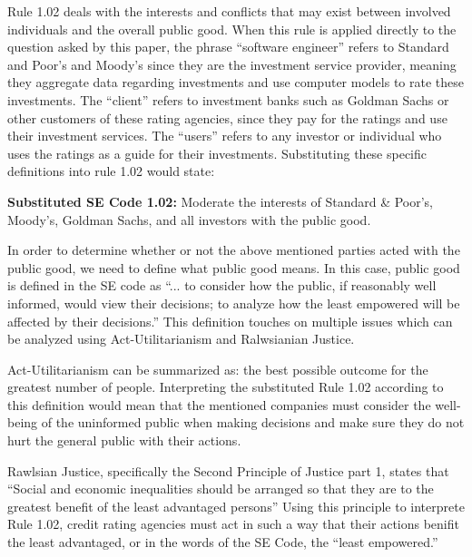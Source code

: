 \documentclass[11pt]{article}
\begin{document}
\begin{multicols}{2}
Rule 1.02 deals with the interests and conflicts that may exist between involved individuals and the overall public good.  When this rule is applied directly to the question asked by this paper, the phrase ``software engineer'' refers to Standard and Poor's and Moody's since they are the investment service provider, meaning they aggregate data regarding investments and use computer models to rate these investments. The ``client'' refers to investment banks such as Goldman Sachs or other customers of these rating agencies, since they pay for the ratings and use their investment services.  The ``users'' refers to any investor or individual who uses the ratings as a guide for their investments.  Substituting these specific definitions into rule 1.02 would state:

\begin{framed}
\noindent
   \textbf{Substituted SE Code 1.02: }  
   \newline
   Moderate the interests of Standard \& Poor's, Moody's, Goldman Sachs, and all investors with the public good.
\end{framed}


In order to determine whether or not the above mentioned parties acted with the public good, we need to define what public good means.  In this case, public good is defined in the SE code as ``... to consider how the public, if reasonably well informed, would view their decisions; to analyze how the least empowered will be affected by their decisions.'' \cite{SEcode}  This definition touches on multiple issues which can be analyzed using Act-Utilitarianism and Ralwsianian Justice. 

Act-Utilitarianism can be summarized as: the best possible outcome for the greatest number of people.\cite{utility}  Interpreting the substituted Rule 1.02 according to this definition would mean that the mentioned companies must consider the well-being of the uninformed public when making decisions and make sure they do not hurt the general public with their actions. 

Rawlsian Justice, specifically the Second Principle of Justice part 1, states that ``Social and economic inequalities should be arranged so that they are to the greatest benefit of the least advantaged persons'' \cite{rawlsian} Using this principle to interprete Rule 1.02, credit rating agencies must act in such a way that their actions benifit the least advantaged, or in the words of the SE Code, the ``least empowered.''  


\end{multicols}
\end{document}
